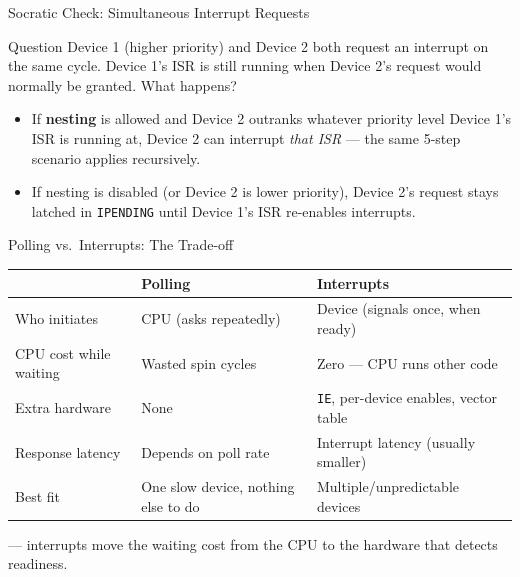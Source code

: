 \documentclass[aspectratio=169]{beamer}
\begin{document}
\begin{frame}{Socratic Check: Simultaneous Interrupt Requests}
  \begin{alertblock}{Question}
    Device 1 (higher priority) and Device 2 both request an interrupt on the
    same cycle. Device 1's ISR is still running when Device 2's request would
    normally be granted. What happens?
  \end{alertblock}
  \begin{itemize}
    \item If \textbf{nesting} is allowed and Device 2 outranks whatever
      priority level Device 1's ISR is running at, Device 2 can interrupt
      \emph{that ISR} --- the same 5-step scenario applies recursively.
    \item If nesting is disabled (or Device 2 is lower priority), Device 2's
      request stays latched in \texttt{IPENDING} until Device 1's ISR
      re-enables interrupts.
  \end{itemize}
\end{frame}

\begin{frame}{Polling vs.\ Interrupts: The Trade-off}
  \footnotesize
  \begin{tabular}{@{}lll@{}}
    \toprule
    & \textbf{Polling} & \textbf{Interrupts} \\
    \midrule
    Who initiates & CPU (asks repeatedly) & Device (signals once, when ready) \\
    CPU cost while waiting & Wasted spin cycles & Zero --- CPU runs other code \\
    Extra hardware & None & \texttt{IE}, per-device enables, vector table \\
    Response latency & Depends on poll rate & Interrupt latency (usually smaller) \\
    Best fit & One slow device, nothing else to do & Multiple/unpredictable devices \\
    \bottomrule
  \end{tabular}
  \vspace{0.3cm}
   --- interrupts move
  the waiting cost from the CPU to the hardware that detects readiness.
\end{frame}


\end{document}
